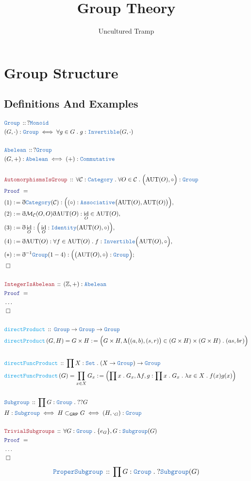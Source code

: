 \documentclass[12pt]{scrartcl}
\author{Uncultured Tramp}
\title{Group Theory}
\newcommand{\TYPE}[1]{\textcolor{NavyBlue}{\mathtt{#1}}}
\newcommand{\FUNC}[1]{\textcolor{Cerulean}{\mathtt{#1}}}
\newcommand{\LOGIC}[1]{\textcolor{Blue}{\mathtt{#1}}}
\newcommand{\THM}[1]{\textcolor{Maroon}{\mathtt{#1}}}
\renewcommand{\.}{\; . \;}
\newcommand{\de}{: \kern 0.1pc =}
\newcommand{\Act}[1]{\left( #1 \right)}
\newcommand{\Theorem}[2]{& \THM{#1} \, :: \, #2 \\ & \Proof = \\ }
\newcommand{\DeclareType}[2]{& \TYPE{#1} \, :: \, #2 \\}
\newcommand{\DefineType}[3]{& #1 : \TYPE{#2} \iff #3 \\}
\newcommand{\DefineNamedType}[4]{& #1 : \TYPE{#2} \iff #3 \iff #4 \\}
\newcommand{\DeclareFunc}[2]{& \FUNC{#1} \, :: \, #2 \\}
\newcommand{\DefineNamedFunc}[4]{&  \FUNC{#1}\Act{#2} = #3 \de #4 \\}
\newcommand{\Page}[1]{ \begin{align*} #1 \end{align*}   }
\newcommand{ \bd }{ \ByDef }
\newcommand{\NoProof}{ & \ldots \\ \EndProof}
\newcommand{\Int}{\mathbb{Z} }
\DeclareMathOperator*{\id}{id}
\newcommand{\Cat}{\TYPE{Category}}
\newcommand{\Say}[3]{& #1 \de #2 : #3, \\}
\newcommand{\Conclude}[3]{& #1 \de #2 : #3; \\}
\newcommand{\QED}{\; \square}
\newcommand{\EndProof}{& \QED \\}
\newcommand{\ByDef}{\eth}
\newcommand{\Proof}{\LOGIC{Proof} \; }
\newcommand{\Group}{\TYPE{Group}}
\newcommand{\Abel}{\TYPE{Abelean}}
\newcommand{\Sgrp}{\subset_{\mathsf{GRP}}}
\begin{document}
\maketitle
\newpage
\tableofcontents
\newpage
\section{Group Structure}
\subsection{Definitions And Examples}
\Page{
	\DeclareType{Group}{?\TYPE{Monoid}}
	\DefineType{(G,\cdot)}{Group}{\forall g \in G \. g : \TYPE{Invertible}(G,\cdot)}
	\\
	\DeclareType{Abelean}{?\TYPE{Group}}
	\DefineType{(G,+)}{Abelean}{ (+) : \TYPE{Commutative}}
	\\
	\Theorem{AutomorphismsIsGroup}{
		\forall \mathcal{C} : \Cat \. \forall O \in \mathcal{C} \. \Big(\mathrm{AUT}(O),\circ \Big) : \Group }
	\Say{(1)}{\bd \Cat(\mathcal{C})}{\Big( (\circ) : \TYPE{Associative}\big(\mathrm{AUT}(O),\mathrm{AUT}(O)\big) \Big)}
	\Say{(2)}{\bd \mathcal{M}_{\mathcal{C}}(O,O) \bd \mathrm{AUT}(O)}{\id_O \in \mathrm{AUT}(O)}
	\Say{(3)}{\bd \id_O}{\Big( \id_O : \TYPE{Identity}(\mathrm{AUT}(O),\circ) \Big)}
	\Say{(4)}{\bd \mathrm{AUT}(O)}{ \forall f \in \mathrm{AUT}(O) \. f : \TYPE{Invertible}\Big(\mathrm{AUT}(O),\circ\Big)}
	\Conclude{(*)}{\bd^{-1} \TYPE{Group}(1-4)}{\Big( \big(\mathrm{AUT}(O),\circ\big) : \TYPE{Group} \Big)}
	\EndProof
	\\
	\Theorem{IntegerIsAbelean}{(\Int,+) : \Abel}
	\NoProof
	\\
	\DeclareFunc{directProduct}{ \TYPE{Group} \to \TYPE{Group} \to \TYPE{Group}}
	\DefineNamedFunc{directProduct}{G,H}{G \times H}{\Big( G \times H, 
		\Lambda \big((a,b),(s,r)\big) \in (G \times H) \times (G \times H) \. (as,br) \Big)}
	\\
	\DeclareFunc{directFuncProduct}{\prod X : \TYPE{Set} \. (X \to \Group) \to \Group}
	\DefineNamedFunc{directFuncProduct}{G}{\prod_{x \in X} G_x}{  
		\left( \prod x \. G_x , \Lambda f,g : \prod x \. G_x \. \lambda x \in X \. f(x)g(x) \right)  }
	\\
	\DeclareType{Subgroup}{\prod G : \Group \. ??G}
	\DefineNamedType{H}{Subgroup}{H \Sgrp G}{(H,\cdot_G) : \Group}
        \\
	\Theorem{TrivialSubgroups}{\forall G : \Group \. \{e_G\},G : \TYPE{Subgroup}(G)}
	\NoProof
}\Page{
	\DeclareType{ProperSubgroup}{\prod G : \Group \. ?\TYPE{Subgroup}(G)}
}
\end{document}
